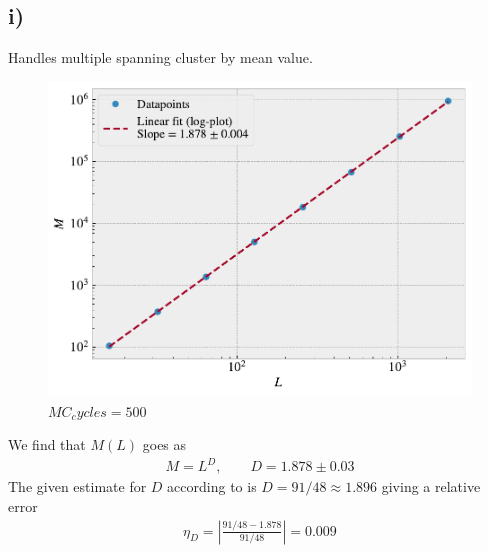 \documentclass[reprint, amsmath, amssymb, aps]{revtex4-2}
\begin{document}
\subsection*{i)}
Handles multiple spanning cluster by mean value.
\begin{figure}[H]
  \includegraphics[width=\linewidth]{figures/i.pdf}
  \caption{$MC_cycles = 500$}
  \label{fig:i}
\end{figure}
We find that $M(L)$ goes as
\begin{align*}
  M = L^D, \qquad D = 1.878 \pm 0.03
\end{align*}
The given estimate for $D$ according to \cite{textbook} is
$D = 91/48 \approx 1.896$ giving a relative error
\begin{align*}
  \eta_D= \left|\frac{91/48 - 1.878}{91/48}\right| = 0.009
\end{align*}
%
%
\end{document}
